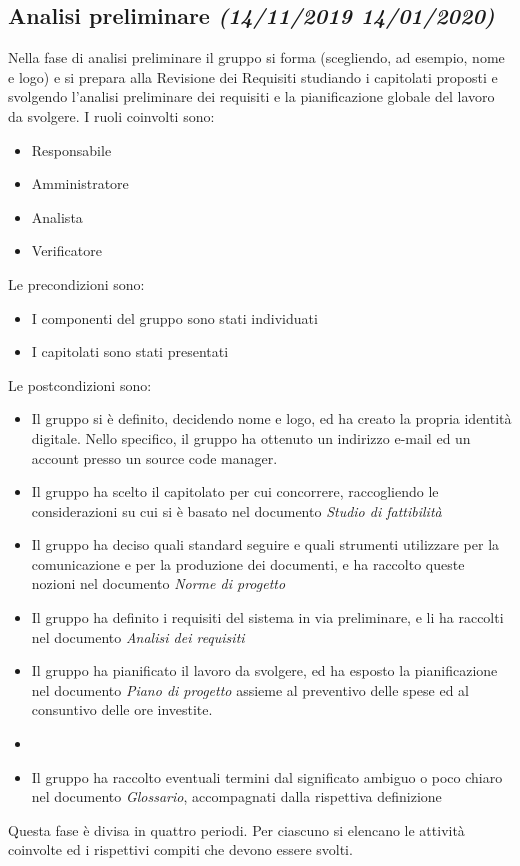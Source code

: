 \documentclass[../piano-di-progetto.tex]{subfiles}
\begin{document}
\subsection[Analisi preliminare]{Analisi preliminare {\normalsize\normalfont\itshape(14/11/2019  14/01/2020)}}%
\label{sub:analisi_preliminare}
Nella fase di analisi preliminare il gruppo si forma (scegliendo, ad esempio, nome e logo) e si prepara alla Revisione dei Requisiti studiando i capitolati proposti e svolgendo l'analisi preliminare dei requisiti e la pianificazione globale del lavoro da svolgere.
I ruoli coinvolti sono:
\begin{itemize}
  \item Responsabile
  \item Amministratore
  \item Analista
  \item Verificatore
\end{itemize}
Le precondizioni sono:
\begin{itemize}
  \item I componenti del gruppo sono stati individuati
  \item I capitolati sono stati presentati
\end{itemize}
Le postcondizioni sono:
\begin{itemize}
  \item Il gruppo si è definito, decidendo nome e logo, ed ha creato la propria identità digitale. Nello specifico, il gruppo ha ottenuto un indirizzo e-mail ed un account presso un source code manager.
  \item Il gruppo ha scelto il capitolato per cui concorrere, raccogliendo le considerazioni su cui si è basato nel documento \textit{Studio di fattibilità}
  \item Il gruppo ha deciso quali standard seguire e quali strumenti utilizzare per la comunicazione e per la produzione dei documenti, e ha raccolto queste nozioni nel documento \textit{Norme di progetto}
  \item Il gruppo ha definito i requisiti del sistema in via preliminare, e li ha raccolti nel documento \textit{Analisi dei requisiti}
  \item Il gruppo ha pianificato il lavoro da svolgere, ed ha esposto la pianificazione nel documento \textit{Piano di progetto} assieme al preventivo delle spese ed al consuntivo delle ore investite.
  \item {}
  \item Il gruppo ha raccolto eventuali termini dal significato ambiguo o poco chiaro nel documento \textit{Glossario}, accompagnati dalla rispettiva definizione
\end{itemize}
Questa fase è divisa in quattro periodi.
Per ciascuno si elencano le attività coinvolte ed i rispettivi compiti che devono essere svolti.
\end{document}

